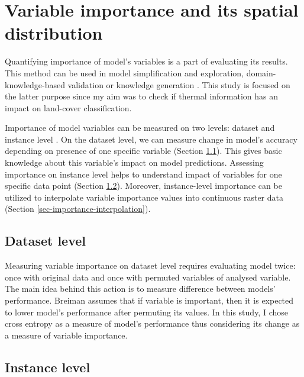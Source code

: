 \documentclass{amuthesis}
\begin{document}
\hypertarget{sec-importance}{%
\section{Variable importance and its spatial
distribution}\label{sec-importance}}

Quantifying importance of model's variables is a part of evaluating its
results. This method can be used in model simplification and
exploration, domain-knowledge-based validation or knowledge generation
\autocite{biecek_explanatory_2021}. This study is focused on the latter
purpose since my aim was to check if thermal information has an impact
on land-cover classification.

Importance of model variables can be measured on two levels: dataset and
instance level \autocite{biecek_explanatory_2021}. On the dataset level,
we can measure change in model's accuracy depending on presence of one
specific variable (Section \ref{sec-importance-dataset}). This gives
basic knowledge about this variable's impact on model predictions.
Assessing importance on instance level helps to understand impact of
variables for one specific data point (Section
\ref{sec-importance-instance}). Moreover, instance-level importance can
be utilized to interpolate variable importance values into continuous
raster data (Section \ref{sec-importance-interpolation}).

\hypertarget{sec-importance-dataset}{%
\subsection{Dataset level}\label{sec-importance-dataset}}

Measuring variable importance on dataset level requires evaluating model
twice: once with original data and once with permuted variables of
analysed variable. The main idea behind this action is to measure
difference between models' performance. Breiman
\autocite*{breiman_random_2001} assumes that if variable is important,
then it is expected to lower model's performance after permuting its
values. In this study, I chose cross entropy as a measure of model's
performance thus considering its change as a measure of variable
importance.

\hypertarget{sec-importance-instance}{%
\subsection{Instance level}\label{sec-importance-instance}}
\end{document}
